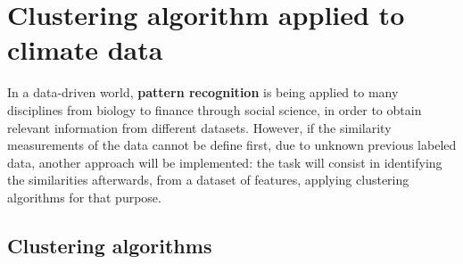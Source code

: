 \section{Clustering algorithm applied to climate data}




In a data-driven world, \textbf{pattern recognition} is being applied to many disciplines from biology to finance through social science, in order to obtain relevant information from different datasets.
However, if the similarity measurements of the data cannot be define first, due to unknown previous labeled data, another approach will be implemented: the task will consist in identifying the similarities afterwards, from a dataset of features, applying clustering algorithms for that purpose.

\subsection{Clustering algorithms}

